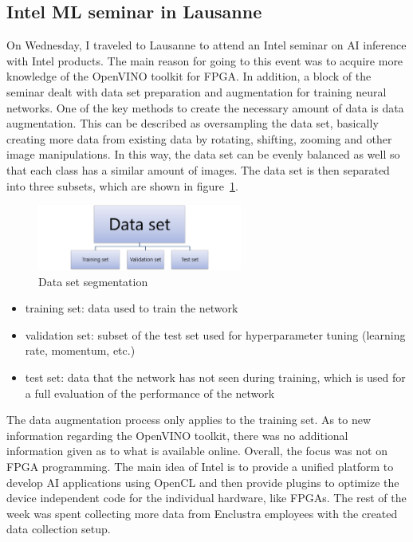 \subsection{Intel \acs{ML} seminar in Lausanne}
On Wednesday, I traveled to Lausanne to attend an Intel seminar on \ac{AI} inference with Intel products. The main reason for going to this event was to acquire more knowledge of the OpenVINO toolkit for \ac{FPGA}. In addition, a block of the seminar dealt with data set preparation and augmentation for training neural networks. One of the key methods to create the necessary amount of data is data augmentation. This can be described as oversampling the data set, basically creating more data from existing data by rotating, shifting, zooming and other image manipulations. In this way, the data set can be evenly balanced as well so that each class has a similar amount of images. The data set is then separated into three subsets, which are shown in figure~\ref{fig:segmentation}.
\begin{figure}[!htb]
	\centering
		\includegraphics[width=0.6\textwidth]{bilder/data_set.png}
		\caption{Data set segmentation}
		\label{fig:segmentation}
\end{figure}
\begin{itemize}
	\item training set: data used to train the network
	\item validation set: subset of the test set used for hyperparameter tuning (learning rate, momentum, etc.)
	\item test set: data that the network has not seen during training, which is used for a full evaluation of the performance of the network
\end{itemize}
The data augmentation process only applies to the training set. As to new information regarding the OpenVINO toolkit, there was no additional information given as to what is available online. Overall, the focus was not on \ac{FPGA} programming. The main idea of Intel is to provide a unified platform to develop \ac{AI} applications using OpenCL and then provide plugins to optimize the device independent code for the individual hardware, like \acp{FPGA}.
The rest of the week was spent collecting more data from Enclustra employees with the created data collection setup.

